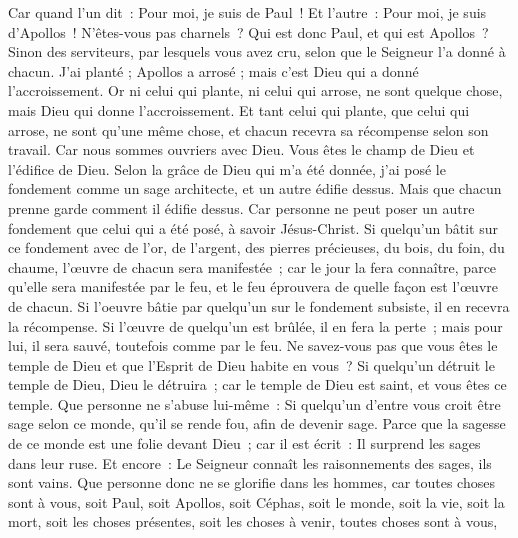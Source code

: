 \begin{multicols}{2}
Car quand l'un dit~: Pour moi, je suis de Paul~! Et l'autre~: Pour moi, je suis d'Apollos~! N'êtes-vous pas charnels~?
Qui est donc Paul, et qui est Apollos~? Sinon des serviteurs, par lesquels vous avez cru, selon que le Seigneur l'a donné à chacun.
J'ai planté ; Apollos a arrosé ; mais c'est Dieu qui a donné l'accroissement.
Or ni celui qui plante, ni celui qui arrose, ne sont quelque chose, mais Dieu qui donne l'accroissement.
Et tant celui qui plante, que celui qui arrose, ne sont qu'une même chose, et chacun recevra sa récompense selon son travail.
Car nous sommes ouvriers avec Dieu. Vous êtes le champ de Dieu et l'édifice de Dieu.
Selon la grâce de Dieu qui m'a été donnée, j'ai posé le fondement comme un sage architecte, et un autre édifie dessus. Mais que chacun prenne garde comment il édifie dessus.
Car personne ne peut poser un autre fondement que celui qui a été posé, à savoir Jésus-Christ.
Si quelqu'un bâtit sur ce fondement avec de l'or, de l'argent, des pierres précieuses, du bois, du foin, du chaume, l'œuvre de chacun sera manifestée~;
car le jour la fera connaître, parce qu'elle sera manifestée par le feu, et le feu éprouvera de quelle façon est l'œuvre de chacun.
Si l'oeuvre bâtie par quelqu'un sur le fondement subsiste, il en recevra la récompense.
Si l'œuvre de quelqu'un est brûlée, il en fera la perte~; mais pour lui, il sera sauvé, toutefois comme par le feu.
Ne savez-vous pas que vous êtes le temple de Dieu et que l'Esprit de Dieu habite en vous~?
Si quelqu'un détruit le temple de Dieu, Dieu le détruira~; car le temple de Dieu est saint, et vous êtes ce temple.
Que personne ne s'abuse lui-même~: Si quelqu'un d'entre vous croit être sage selon ce monde, qu'il se rende fou, afin de devenir sage.
Parce que la sagesse de ce monde est une folie devant Dieu~; car il est écrit~: Il surprend les sages dans leur ruse.
Et encore~: Le Seigneur connaît les raisonnements des sages, ils sont vains.
Que personne donc ne se glorifie dans les hommes, car toutes choses sont à vous,
soit Paul, soit Apollos, soit Céphas, soit le monde, soit la vie, soit la mort, soit les choses présentes, soit les choses à venir, toutes choses sont à vous,

\end{multicols}

